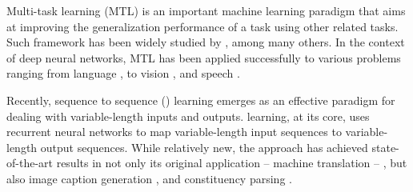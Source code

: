 Multi-task learning (MTL) is an important machine learning paradigm that
aims at improving the generalization performance of a task using other related
tasks. 
Such framework has been widely studied by
, among many
others. In the context of deep neural networks, MTL has
been applied successfully to various problems ranging from language
\cite{liu15}, to vision
\cite{donahue14},
and speech \cite{heigold13,huang2013cross}.

Recently, sequence to sequence (\ssl{}) learning
\cite{kal13,sutskever14,cho14} emerges as an effective paradigm for dealing with
variable-length inputs and outputs. \ssl{} learning, at its core, uses
recurrent neural networks to map variable-length input sequences to
variable-length output sequences.  While relatively new, the \ssl{}
approach has achieved state-of-the-art results in not only its original
application -- machine translation --
\cite{luong15,jean15,luong15attn,jean15wmt,luong15iwslt}, but also image caption generation \cite{vinyals15caption},
and constituency parsing \cite{vinyals15grammar}. 

